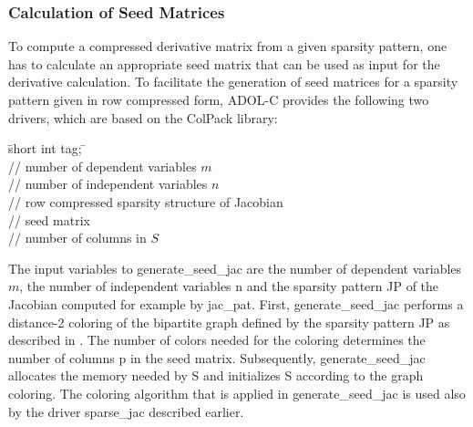 \documentclass[11pt,twoside]{article}
\begin{document}
\subsubsection*{Calculation of Seed Matrices}
%
To compute a compressed derivative matrix from a given sparsity
pattern, one has to calculate an appropriate seed matrix that can be
used as input for the derivative calculation. To facilitate the
generation of seed matrices for a sparsity pattern given in
row compressed form, ADOL-C provides the following two drivers,
which are based on the ColPack library:
\begin{tabbing}
\hspace{0.5in}\={\sf short int tag;} \hspace{1.3in}\= \kill    %
\\
 \> // number of dependent variables $m$\\
 \> // number of independent variables $n$\\
 \> // row compressed sparsity structure
of Jacobian\\
 \> // seed matrix\\
 \> // number of columns in $S$
\end{tabbing}
The input variables to {\sf generate\_seed\_jac} are the number of dependent variables $m$, the
number of independent variables {\sf n} and the sparsity pattern {\sf
  JP} of the Jacobian computed for example by {\sf jac\_pat}. First, 
{\sf generate\_seed\_jac} performs a distance-2 coloring of the bipartite graph defined by the sparsity
pattern {\sf JP} as described in \cite{GeMaPo05}. The number of colors needed for the coloring
determines the number of columns {\sf p} in the seed
matrix. Subsequently, {\sf generate\_seed\_jac} allocates the memory needed by {\sf
 S} and initializes {\sf S} according to the graph coloring.
The coloring algorithm that is applied in {\sf
  generate\_seed\_jac} is used also by the driver {\sf sparse\_jac}
described earlier.
\end{document}
